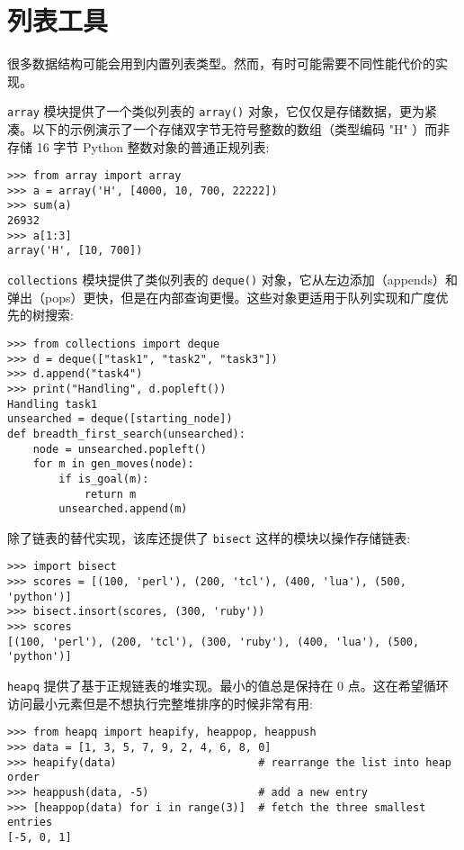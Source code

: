\section{列表工具}
很多数据结构可能会用到内置列表类型。然而，有时可能需要不同性能代价的实现。

\texttt{array} 模块提供了一个类似列表的 \texttt{array()} 对象，它仅仅是存储数据，更为紧凑。以下的示例演示了一个存储双字节无符号整数的数组（类型编码 "H" ）而非存储 16 字节 Python 整数对象的普通正规列表:
\begin{lstlisting}
>>> from array import array
>>> a = array('H', [4000, 10, 700, 22222])
>>> sum(a)
26932
>>> a[1:3]
array('H', [10, 700])
\end{lstlisting}
\texttt{collections} 模块提供了类似列表的 \texttt{deque()} 对象，它从左边添加（appends）和弹出（pops）更快，但是在内部查询更慢。这些对象更适用于队列实现和广度优先的树搜索:
\begin{lstlisting}
>>> from collections import deque
>>> d = deque(["task1", "task2", "task3"])
>>> d.append("task4")
>>> print("Handling", d.popleft())
Handling task1
unsearched = deque([starting_node])
def breadth_first_search(unsearched):
    node = unsearched.popleft()
    for m in gen_moves(node):
        if is_goal(m):
            return m
        unsearched.append(m)
\end{lstlisting}
除了链表的替代实现，该库还提供了 \texttt{bisect} 这样的模块以操作存储链表:
\begin{lstlisting}
>>> import bisect
>>> scores = [(100, 'perl'), (200, 'tcl'), (400, 'lua'), (500, 'python')]
>>> bisect.insort(scores, (300, 'ruby'))
>>> scores
[(100, 'perl'), (200, 'tcl'), (300, 'ruby'), (400, 'lua'), (500, 'python')]
\end{lstlisting}
\texttt{heapq} 提供了基于正规链表的堆实现。最小的值总是保持在 0 点。这在希望循环访问最小元素但是不想执行完整堆排序的时候非常有用:
\begin{lstlisting}
>>> from heapq import heapify, heappop, heappush
>>> data = [1, 3, 5, 7, 9, 2, 4, 6, 8, 0]
>>> heapify(data)                      # rearrange the list into heap order
>>> heappush(data, -5)                 # add a new entry
>>> [heappop(data) for i in range(3)]  # fetch the three smallest entries
[-5, 0, 1]
\end{lstlisting}
